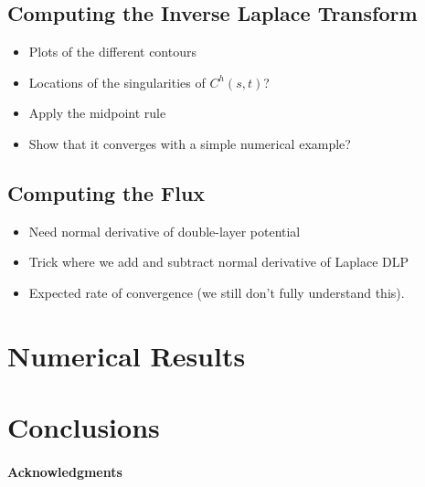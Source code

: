 \documentclass[preprint, 10pt]{elsarticle}
\begin{document}
\subsection{Computing the Inverse Laplace Transform} 
\label{sec:talbot}
\begin{itemize}
  \item Plots of the different contours
  \item Locations of the singularities of $C^h(s,t)$?
  \item Apply the midpoint rule
  \item Show that it converges with a simple numerical example?
\end{itemize}


\subsection{Computing the Flux}
\label{sec:flux}
\begin{itemize}
  \item Need normal derivative of double-layer potential
  \item Trick where we add and subtract normal derivative of Laplace DLP
  \item Expected rate of convergence (we still don't fully understand
    this).
\end{itemize}






\section{Numerical Results}


\section{Conclusions\label{s:conclusions}}

\paragraph{\bf Acknowledgments} 

 


\end{document}
